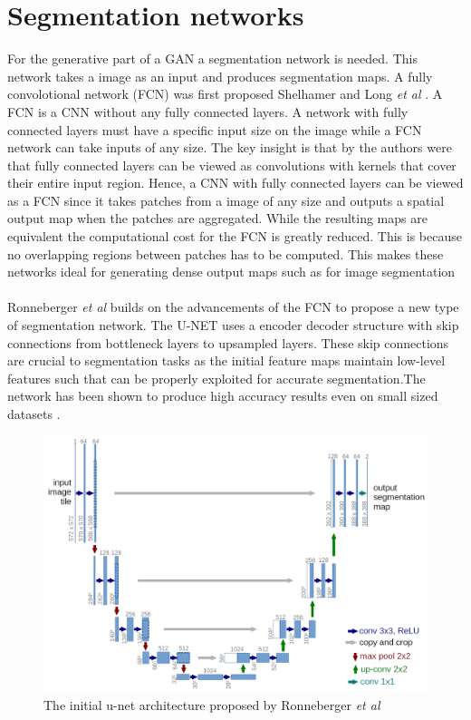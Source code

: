 \documentclass{kththesis}
\begin{document}
\section{Segmentation networks}
For the generative part of a GAN a segmentation network is needed. This network takes a image as an input and produces segmentation maps.
A fully convolotional network (FCN) was first proposed Shelhamer and Long \textit{et al} \parencite{shelhamer_fully_2016}. A FCN is a CNN without any fully connected layers. A network with fully connected layers must have a specific input size on the image while a FCN network can take inputs of any size. The key insight is that by the authors were that fully connected layers can be viewed as convolutions with kernels that cover their entire input region. Hence, a CNN with fully connected layers can be viewed as a FCN since it takes patches from a image of any size and outputs a spatial output map when the patches are aggregated. While the resulting maps are equivalent the computational cost for the FCN is greatly reduced. This is because no overlapping regions between patches has to be computed. This makes these networks ideal for generating dense output maps such as for image segmentation\\
\\
Ronneberger \textit{et al} \parencite{ronneberger_u-net:_2015} builds on the advancements of the FCN to propose a new type of segmentation network. The U-NET uses a encoder decoder structure with skip connections from bottleneck layers to upsampled layers. These skip connections are crucial to segmentation tasks as the initial feature maps maintain low-level features such that can be properly exploited for accurate segmentation.The network has been shown to produce high accuracy results even on small sized datasets \parencite{son_retinal_2017, ronneberger_u-net:_2015, isola_image--image_2016, xue_segan:_2017, yang_automatic_2017}. 
\begin{figure}[h!]
  \centering
      \includegraphics[scale=0.2]{u-net}
  \caption{The initial u-net architecture proposed by Ronneberger \textit{et al} \cite{ronneberger_u-net:_2015} \label{fig:unet}}
\end{figure}
\end{document}
